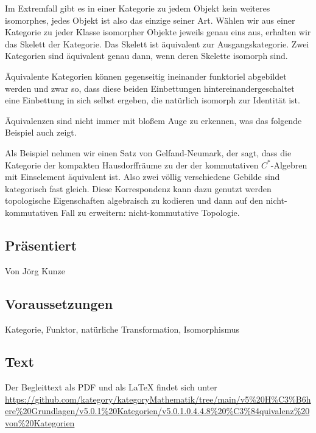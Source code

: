 \documentclass[a4paper]{amsart}
\theoremstyle{definition}
\begin{document}
Im Extremfall gibt es in einer Kategorie zu jedem Objekt kein weiteres isomorphes, jedes Objekt ist also das einzige seiner Art. Wählen wir aus einer Kategorie zu jeder Klasse isomorpher Objekte jeweils genau eins aus, erhalten wir das Skelett der Kategorie. Das Skelett ist äquivalent zur Ausgangskategorie. Zwei Kategorien sind äquivalent genau dann, wenn deren Skelette isomorph sind.

Äquivalente Kategorien können gegenseitig ineinander funktoriel abgebildet werden und zwar so, dass diese beiden Einbettungen hintereinandergeschaltet eine Einbettung in sich selbst ergeben, die  natürlich isomorph zur Identität ist.

Äquivalenzen sind nicht immer mit bloßem Auge zu erkennen, was das folgende Beispiel auch zeigt.

Als Beispiel nehmen wir einen Satz von Gelfand-Neumark, der sagt, dass die Kategorie der kompakten Hausdorffräume zu der der kommutativen $C^*$-Algebren mit Einselement äquivalent ist. Also zwei völlig verschiedene Gebilde sind kategorisch fast gleich. Diese Korrespondenz kann dazu genutzt werden topologische Eigenschaften algebraisch zu kodieren und dann auf den nicht-kommutativen Fall zu erweitern: nicht-kommutative Topologie.  

\subsection*{Präsentiert}
Von Jörg Kunze

\subsection*{Voraussetzungen}
Kategorie, Funktor, natürliche Transformation, Isomorphismus

\subsection*{Text}
Der Begleittext als PDF und als LaTeX findet sich unter
{\tiny
   \url{https://github.com/kategory/kategoryMathematik/tree/main/v5%20H%C3%B6here%20Grundlagen/v5.0.1%20Kategorien/v5.0.1.0.4.4.8%20%C3%84quivalenz%20von%20Kategorien}
}
\end{document}
